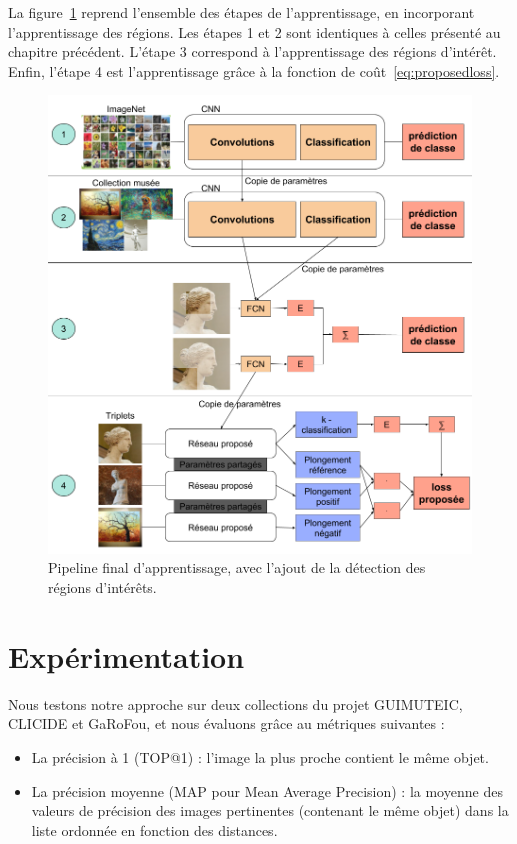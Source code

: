 La figure~\ref{fig:finalpipeline} reprend l'ensemble des étapes de l'apprentissage, en incorporant l'apprentissage des régions. 
Les étapes 1 et 2 sont identiques à celles présenté au chapitre précédent.
L'étape 3 correspond à l'apprentissage des régions d'intérêt.
Enfin, l'étape 4 est l'apprentissage grâce à la fonction de coût~\ref{eq:proposedloss}.	
\begin{figure}%
\includegraphics[width=\columnwidth]{figures/pipelinefinal.png}%
\caption{Pipeline final d'apprentissage, avec l'ajout de la détection des régions d'intérêts.}%
\label{fig:finalpipeline}%
\end{figure}


\section{Expérimentation}

Nous testons notre approche sur deux collections du projet GUIMUTEIC, CLICIDE et GaRoFou, et nous évaluons grâce au métriques suivantes :
\begin{itemize}
	\item La précision à 1 (TOP@1) : l'image la plus proche contient le même objet.
	\item La précision moyenne (MAP pour Mean Average Precision) : la moyenne des valeurs de précision des images pertinentes (contenant le même objet) dans la liste ordonnée en fonction des distances.
\end{itemize}






